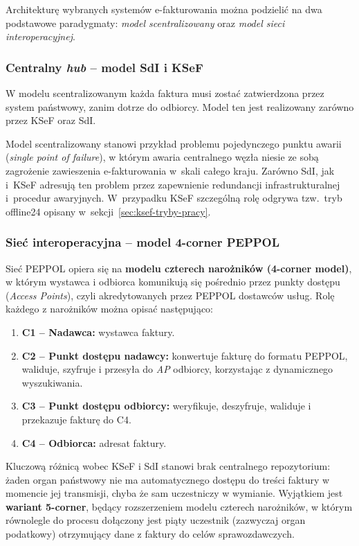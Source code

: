 Architekturę wybranych systemów e-fakturowania można podzielić na dwa podstawowe paradygmaty: \textit{model scentralizowany} oraz \textit{model sieci interoperacyjnej}. \cite{edicom-einvoice-models}

\subsubsection{Centralny \textit{hub} -- model SdI i KSeF}
\label{sec:porownanie-central-hub}

W modelu scentralizowanym każda faktura musi zostać zatwierdzona przez system państwowy, zanim dotrze do odbiorcy. Model ten jest realizowany zarówno przez KSeF oraz SdI.

Model scentralizowany stanowi przykład problemu pojedynczego punktu awarii (\textit{single point of failure}), w którym awaria centralnego węzła niesie ze sobą zagrożenie zawieszenia e-fakturowania w~skali całego kraju. Zarówno SdI, jak i~KSeF adresują ten problem przez zapewnienie redundancji infrastrukturalnej i~procedur awaryjnych. W~przypadku KSeF szczególną rolę odgrywa tzw.\ tryb offline24 opisany w~sekcji~\ref{sec:ksef-tryby-pracy}.

\subsubsection{Sieć interoperacyjna -- model 4-corner PEPPOL}
\label{sec:porownanie-4corner}

Sieć PEPPOL opiera się na \textbf{modelu czterech narożników (4-corner model)}, w którym wystawca i odbiorca komunikują się pośrednio przez punkty dostępu (\textit{Access Points}), czyli akredytowanych przez PEPPOL dostawców usług. Rolę każdego z narożników można opisać następująco:

\begin{enumerate}
    \item \textbf{C1 -- Nadawca:} wystawca faktury.
    \item \textbf{C2 -- Punkt dostępu nadawcy:} konwertuje fakturę do formatu PEPPOL, waliduje, szyfruje i przesyła do \textit{AP} odbiorcy, korzystając z dynamicznego wyszukiwania.
    \item \textbf{C3 -- Punkt dostępu odbiorcy:} weryfikuje, deszyfruje, waliduje i przekazuje fakturę do C4.
    \item \textbf{C4 -- Odbiorca:} adresat faktury.
\end{enumerate}

Kluczową różnicą wobec KSeF i SdI stanowi brak centralnego repozytorium: żaden organ państwowy nie ma automatycznego dostępu do treści faktury w momencie jej transmisji, chyba że sam uczestniczy w wymianie. Wyjątkiem jest \textbf{wariant 5-corner}, będący rozszerzeniem modelu czterech narożników, w którym równolegle do procesu dołączony jest piąty uczestnik (zazwyczaj organ podatkowy) otrzymujący dane z faktury do celów sprawozdawczych. \cite{peppol-interop-framework,einvoicing-dicovering-pepol}


